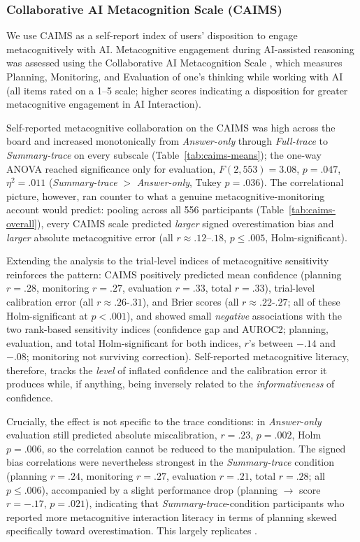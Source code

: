 \documentclass[manuscript,review,anonymous]{acmart}
\begin{document}
\subsubsection{Collaborative AI Metacognition Scale (CAIMS)}
We use CAIMS as a self-report index of users' disposition to engage metacognitively with AI.
Metacognitive engagement during AI-assisted reasoning was assessed using the Collaborative AI Metacognition Scale \cite{Sidra03042026}, which measures Planning, Monitoring, and Evaluation of one's thinking while working with AI (all items rated on a 1--5 scale; higher scores indicating a disposition for greater metacognitive engagement in AI Interaction).

Self-reported metacognitive collaboration on the CAIMS was high across the board and increased monotonically from \textit{Answer-only} through \textit{Full-trace} to \textit{Summary-trace} on every
subscale (Table~\ref{tab:caims-means}); the one-way ANOVA reached
significance only for evaluation, $F(2, 553) = 3.08$, $p = .047$,
$\eta^2 = .011$ (\textit{Summary-trace} $>$ \textit{Answer-only}, Tukey $p = .036$). The correlational picture, however, ran counter to what a genuine
metacognitive-monitoring account would predict: pooling across all 556 participants (Table~\ref{tab:caims-overall}), every CAIMS scale
predicted \emph{larger} signed overestimation bias and \emph{larger} absolute metacognitive error (all $r \approx .12$--$.18$,
$p \leq .005$, Holm-significant).

Extending the analysis to the trial-level indices of metacognitive sensitivity reinforces the pattern: CAIMS
positively predicted mean confidence (planning $r = .28$, monitoring $r = .27$, evaluation $r = .33$, total $r = .33$), trial-level calibration error (all $r \approx .26$-$.31$), and Brier scores (all $r \approx .22$-$.27$; all of these Holm-significant at
$p < .001$), and showed small \emph{negative} associations with the two rank-based sensitivity indices (confidence gap and AUROC2; planning, evaluation, and total Holm-significant for both indices, $r$'s between $-.14$ and $-.08$; monitoring not surviving correction). Self-reported metacognitive literacy, therefore, tracks the \emph{level} of inflated confidence and the calibration error it
produces while, if anything, being inversely related to the \emph{informativeness} of confidence.

Crucially, the effect is not specific to the trace conditions: in
\textit{Answer-only} evaluation still predicted absolute miscalibration, $r = .23$, $p = .002$,
Holm $p = .006$, so the correlation cannot be reduced to the manipulation. The signed bias correlations were nevertheless
strongest in the \textit{Summary-trace} condition (planning $r = .24$, monitoring $r = .27$, evaluation $r = .21$, total $r = .28$; all $p \leq .006$),
accompanied by a slight performance drop (planning $\rightarrow$ score $r = -.17$, $p = .021$), indicating that \textit{Summary-trace}-condition participants who reported more metacognitive interaction literacy in terms of planning skewed specifically toward overestimation. This largely replicates \citet{FERNANDES2026108779}.
\end{document}
